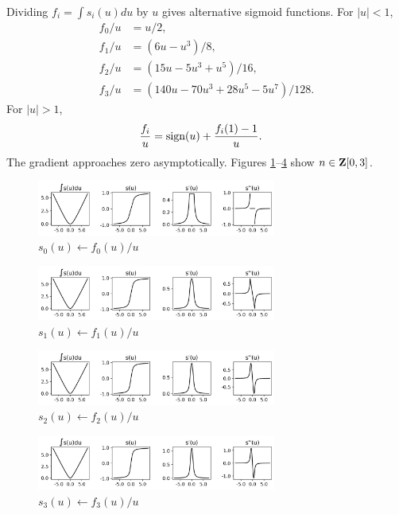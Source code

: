 \documentclass{article}
\begin{document}
\clearpage
    Dividing $f_i=\int s_i(u)du$ by $u$ gives alternative sigmoid functions. For $|u|<1$,
    \begin{align*}
        f_0/u&=u/2,\\
        f_1/u&=\left(6u-u^3\right)/8,\\
        f_2/u&=\left(15u-5u^3+u^5\right)/16,\\
        f_3/u&=\left(140u-70u^3+28u^5-5u^7\right)/128.
    \end{align*}
    For $|u|>1$,
    \begin{align*}
        \frac{f_i}{u}&=\text{sign}(u)+\frac{f_i(1)-1}{u}.
    \end{align*}
    The gradient approaches zero asymptotically.
    Figures \ref{fig:inv_poly0}--\ref{fig:inv_poly3} show $n\in\textbf{Z}[0,3]$.
    \begin{figure}[h!]
        \centering
        \includegraphics[width=0.7\textwidth]{./figs/nn/sig/inv_poly0.png}
        \caption{$s_0(u)\leftarrow f_0(u)/u$}
        \label{fig:inv_poly0}
    \end{figure}
    \begin{figure}[h!]
        \centering
        \includegraphics[width=0.7\textwidth]{./figs/nn/sig/inv_poly1.png}
        \caption{$s_1(u)\leftarrow f_1(u)/u$}
        \label{fig:inv_poly1}
    \end{figure}
    \begin{figure}[h!]
        \centering
        \includegraphics[width=0.7\textwidth]{./figs/nn/sig/inv_poly2.png}
        \caption{$s_2(u)\leftarrow f_2(u)/u$}
        \label{fig:inv_poly2}
    \end{figure}
    \begin{figure}[h!]
        \centering
        \includegraphics[width=0.7\textwidth]{./figs/nn/sig/inv_poly3.png}
        \caption{$s_3(u)\leftarrow f_3(u)/u$}
        \label{fig:inv_poly3}
    \end{figure}
\end{document}
